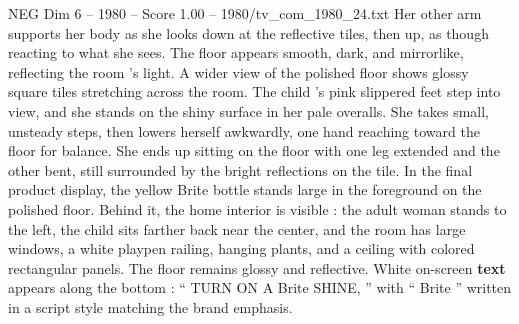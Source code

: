 \begin{textsample}{NEG Dim 6 – 1980 – Score 1.00 – 1980/tv\_com\_1980\_24.txt}
Her other arm supports her body as she looks down at the reflective tiles, then up, as though reacting to what she sees.
The floor appears smooth, dark, and mirrorlike, reflecting the room ’s light.
A wider view of the polished floor shows glossy square tiles stretching across the room.
The child ’s pink slippered feet step into view, and she stands on the shiny surface in her pale overalls.
She takes small, unsteady steps, then lowers herself awkwardly, one hand reaching toward the floor for balance.
She ends up sitting on the floor with one leg extended and the other bent, still surrounded by the bright reflections on the tile.
In the final product display, the yellow Brite bottle stands large in the foreground on the polished floor.
Behind it, the home interior is visible : the adult woman stands to the left, the child sits farther back near the center, and the room has large windows, a white playpen railing, hanging plants, and a ceiling with colored rectangular panels.
The floor remains glossy and reflective.
White on-screen \textbf{text} appears along the bottom : “ TURN ON A Brite SHINE, ” with “ Brite ” written in a script style matching the brand emphasis.

\end{textsample}
